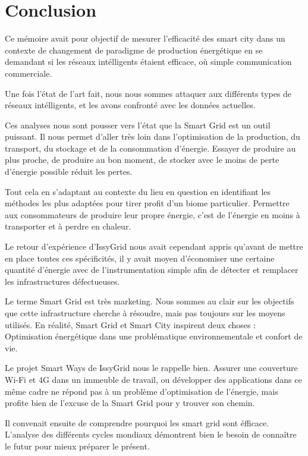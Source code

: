 \chapter*{Conclusion}

Ce mémoire avait pour objectif de mesurer l'efficacité des smart city dans un contexte de changement
de paradigme de production énergétique en se demandant si les réseaux intélligents étaient efficace,
où simple communication commerciale.

Une fois l'état de l'art fait, nous nous sommes attaquer aux différents types de réseaux intélligents,
et les avons confronté avec les données actuelles.

Ces analyses nous sont pousser vers l'état que la Smart Grid est un outil puissant.
Il nous permet d'aller très loin dans l'optimisation de la production, du transport,
du stockage et de la consommation d'énergie.
Essayer de produire au plus proche, de produire au bon moment, de stocker avec le moins de perte d'énergie possible
réduit les pertes.

Tout cela en s'adaptant au contexte du lieu en question en identifiant les méthodes
les plus adaptées pour tirer profit d'un biome particulier.
Permettre aux consommateurs de produire leur propre énergie, c'est de l'énergie en moins à transporter et à perdre en chaleur.

Le retour d'expérience d'IssyGrid nous avait cependant appris qu'avant de mettre en place toutes ces spécificités,
il y avait moyen d'économiser une certaine quantité d'énergie avec de l'instrumentation
simple afin de détecter et remplacer les infrastructures défectueuses.

Le terme Smart Grid est très marketing.
Nous sommes au clair sur les objectifs que cette infrastructure cherche à résoudre, mais pas toujours sur les moyens utilisés.
En réalité, Smart Grid et Smart City inspirent deux choses :
Optimisation énergétique dans une problématique environnementale et confort de vie.

Le projet Smart Ways de IssyGrid nous le rappelle bien.
Assurer une couverture Wi-Fi et 4G dans un immeuble de travail,
ou développer des applications dans ce même cadre ne répond pas à un problème
d’optimisation de l'énergie, mais profite bien de l’excuse de la Smart Grid pour y trouver son chemin.

Il convenait ensuite de comprendre pourquoi les smart grid sont éfficace.
L'analyse des différents cycles mondiaux démontrent bien le besoin de connaître le futur pour
mieux préparer le présent.

